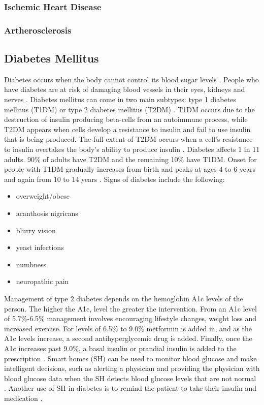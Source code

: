 \subsubsection{Ischemic Heart Disease}
\subsubsection{Artherosclerosis}

\subsection{Diabetes Mellitus}
Diabetes occurs when the body cannot control its blood sugar levels \cite{sapra_diabetes_2021}. People who have diabetes are at risk of damaging blood vessels in their eyes, kidneys and nerves \cite{sapra_diabetes_2021}. Diabetes mellitus can come in two main subtypes: type 1 diabetes mellitus (T1DM) or type 2 diabetes mellitus (T2DM) \cite{sapra_diabetes_2021}. T1DM occurs due to the destruction of insulin producing beta-cells from an autoimmune process, while T2DM appears when cells develop a resistance to insulin and fail to use insulin that is being produced. The full extent of T2DM occurs when a cell’s resistance to insulin overtakes the body’s ability to produce insulin \cite{sapra_diabetes_2021}. Diabetes affects 1 in 11 adults. 90\% of adults have T2DM and the remaining 10\% have T1DM. Onset for people with T1DM gradually increases from birth and peaks at ages 4 to 6 years and again from 10 to 14 years \cite{sapra_diabetes_2021}. 
Signs of diabetes include the following:
\begin{itemize}
    \item overweight/obese \cite{sapra_diabetes_2021}
    \item acanthosis nigricans \cite{sapra_diabetes_2021}
    \item blurry vision \cite{sapra_diabetes_2021}
    \item yeast infections \cite{sapra_diabetes_2021}
    \item numbness \cite{sapra_diabetes_2021}
    \item neuropathic pain \cite{sapra_diabetes_2021}
\end{itemize}
Management of type 2 diabetes depends on the hemoglobin A1c levels of the person. The higher the A1c, level the greater the intervention. From an A1c level of 5.7\%-6.5\% management involves encouraging lifestyle changes, weight loss and increased exercise. For levels of 6.5\% to 9.0\% metformin is added in, and as the A1c levels increase, a second antihyperglycemic drug is added. Finally, once the A1c increases past 9.0\%, a basal insulin or prandial insulin is added to the prescription \cite{reusch_management_2017}.
Smart homes (SH) can be used to monitor blood glucose and make intelligent decisions, such as alerting a physician and providing the physician with blood glucose data when the SH detects blood glucose levels that are not normal \cite{rghioui_smart_2020}. Another use of SH in diabetes is to remind the patient to take their insulin and medication \cite{norell_pejner_smart_2019}.


